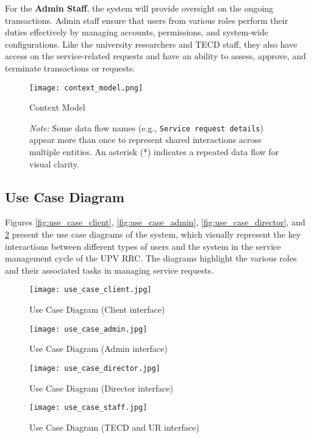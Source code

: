 For the \textbf{Admin Staff}, the system will provide oversight on the ongoing transactions. Admin staff ensure that users from various roles perform their duties effectively by managing accounts, permissions, and system-wide configurations. Like the university researchers and TECD staff, they also have access on the service-related requests and have an ability to assess, approve, and terminate transactions or requests.

\newpage

\begin{figure}[h]
	\centering 
	\texttt{[image: context\_model.png]}
	\caption{Context Model}
	\caption*{\textit{Note:} Some data flow names (e.g., \texttt{Service request details}) appear more than once to represent shared interactions across multiple entities. An asterisk (*) indicates a repeated data flow for visual clarity.}
	\label{fig:context_model}
\end{figure}

\subsection{Use Case Diagram}

Figures \ref{fig:use_case_client}, \ref{fig:use_case_admin}, \ref{fig:use_case_director}, and \ref{fig:use_case_staff} present the use case diagrams of the system, which visually represent the key interactions between different types of users and the system in the service management cycle of the UPV RRC. The diagrams highlight the various roles and their associated tasks in managing service requests.

\newpage

\begin{figure}[h]
	\centering
	\begin{minipage}{0.30\textwidth}
		\centering
		\texttt{[image: use\_case\_client.jpg]}
		\caption{Use Case Diagram (Client interface)}
		\label{fig:use_case_client}
	\end{minipage}%
	\hfill
	\begin{minipage}{0.32\textwidth}
		\centering
		\texttt{[image: use\_case\_admin.jpg]}
		\caption{Use Case Diagram (Admin interface)}
		\label{fig:use_case_admin}
	\end{minipage}
	
	\vspace{0.5cm} %
	
	\begin{minipage}{0.30\textwidth}
		\centering
		\texttt{[image: use\_case\_director.jpg]}
		\caption{Use Case Diagram (Director interface)}
		\label{fig:use_case_director}
	\end{minipage}%
	\hfill
	\begin{minipage}{0.30\textwidth}
		\centering
		\texttt{[image: use\_case\_staff.jpg]}
		\caption{Use Case Diagram (TECD and UR interface)}
		\label{fig:use_case_staff}
	\end{minipage}
\end{figure}

